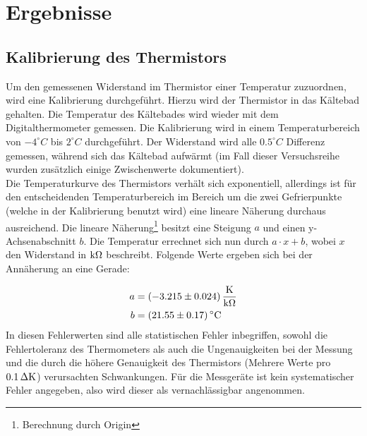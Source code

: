 \section{Ergebnisse}

\subsection{Kalibrierung des Thermistors}
Um den gemessenen Widerstand im Thermistor einer Temperatur zuzuordnen, wird eine Kalibrierung durchgeführt. Hierzu wird der Thermistor in das Kältebad gehalten. Die Temperatur des Kältebades wird wieder mit dem Digitalthermometer gemessen. Die Kalibrierung wird in einem Temperaturbereich von $-4^\circ C$ bis $2^\circ C$ durchgeführt. Der Widerstand wird alle $0.5^\circ C$ Differenz gemessen, während sich das Kältebad aufwärmt (im Fall dieser Versuchsreihe wurden zusätzlich einige Zwischenwerte dokumentiert).\\
Die Temperaturkurve des Thermistors verhält sich exponentiell, allerdings ist für den entscheidenden Temperaturbereich im Bereich um die zwei Gefrierpunkte (welche in der Kalibrierung benutzt wird) eine lineare Näherung durchaus ausreichend. Die lineare Näherung\footnote{Berechnung durch Origin} besitzt eine Steigung $a$ und einen y-Achsenabschnitt $b$. Die Temperatur errechnet sich nun durch $a \cdot x + b$, wobei $x$ den Widerstand in $\unit[]{k\Omega}$ beschreibt. Folgende Werte ergeben sich bei der Annäherung an eine Gerade:

\begin{align*}
a &= \unit[(-3.215 \pm 0.024)]{\frac{K}{k\Omega}}\\
b &= \unit[(21.55 \pm 0.17)]{^\circ C}
\end{align*}
%
In diesen Fehlerwerten sind alle statistischen Fehler inbegriffen, sowohl die Fehlertoleranz des Thermometers als auch die Ungenauigkeiten bei der Messung und die durch die höhere Genauigkeit des Thermistors (Mehrere Werte pro $\unit[0.1]{\Delta K}$) verursachten Schwankungen. Für die Messgeräte ist kein systematischer Fehler angegeben, also wird dieser als vernachlässigbar angenommen.


